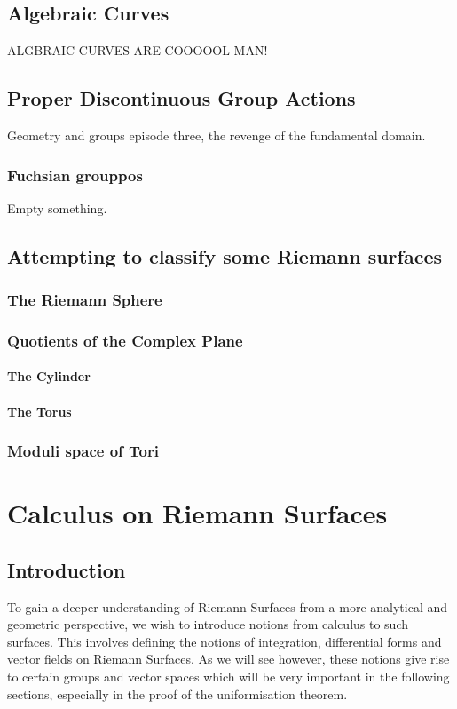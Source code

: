 \documentclass[11pt]{report}
\theoremstyle{definition}
\begin{document}
\section{Algebraic Curves}\label{algcurv}
ALGBRAIC CURVES ARE COOOOOL MAN!

\section{Proper Discontinuous Group Actions}\label{PropDiscGrpAct}
Geometry and groups episode three, the revenge of the fundamental domain.
\subsection{Fuchsian grouppos}
Empty something.

\section{Attempting to classify some Riemann surfaces}
\subsection{The Riemann Sphere}
\subsection{Quotients of the Complex Plane}
\subsubsection{The Cylinder}
\subsubsection{The Torus}
\subsection{Moduli space of Tori}

\chapter{Calculus on Riemann Surfaces}
\section{Introduction}
To gain a deeper understanding of Riemann Surfaces from a more analytical
and geometric perspective, we wish to introduce notions from calculus to
such surfaces. This involves defining the notions of integration,
differential forms and vector fields on Riemann Surfaces. As we will see
however, these notions give rise to certain groups and vector spaces
which will be very important in the following sections, especially in the
proof of the uniformisation theorem.
\end{document}
